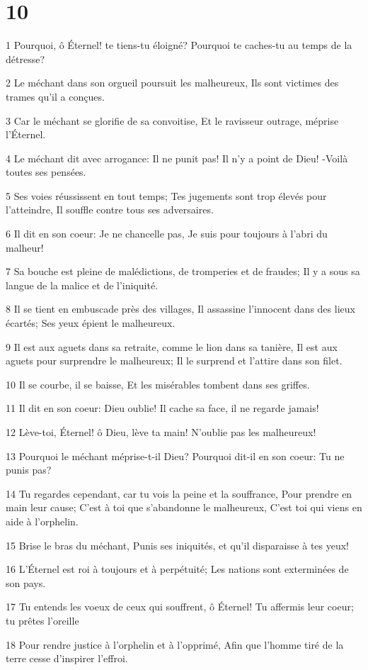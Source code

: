 \chapter{10}

\par 1 Pourquoi, ô Éternel! te tiens-tu éloigné? Pourquoi te caches-tu au temps de la détresse?
\par 2 Le méchant dans son orgueil poursuit les malheureux, Ils sont victimes des trames qu'il a conçues.
\par 3 Car le méchant se glorifie de sa convoitise, Et le ravisseur outrage, méprise l'Éternel.
\par 4 Le méchant dit avec arrogance: Il ne punit pas! Il n'y a point de Dieu! -Voilà toutes ses pensées.
\par 5 Ses voies réussissent en tout temps; Tes jugements sont trop élevés pour l'atteindre, Il souffle contre tous ses adversaires.
\par 6 Il dit en son coeur: Je ne chancelle pas, Je suis pour toujours à l'abri du malheur!
\par 7 Sa bouche est pleine de malédictions, de tromperies et de fraudes; Il y a sous sa langue de la malice et de l'iniquité.
\par 8 Il se tient en embuscade près des villages, Il assassine l'innocent dans des lieux écartés; Ses yeux épient le malheureux.
\par 9 Il est aux aguets dans sa retraite, comme le lion dans sa tanière, Il est aux aguets pour surprendre le malheureux; Il le surprend et l'attire dans son filet.
\par 10 Il se courbe, il se baisse, Et les misérables tombent dans ses griffes.
\par 11 Il dit en son coeur: Dieu oublie! Il cache sa face, il ne regarde jamais!
\par 12 Lève-toi, Éternel! ô Dieu, lève ta main! N'oublie pas les malheureux!
\par 13 Pourquoi le méchant méprise-t-il Dieu? Pourquoi dit-il en son coeur: Tu ne punis pas?
\par 14 Tu regardes cependant, car tu vois la peine et la souffrance, Pour prendre en main leur cause; C'est à toi que s'abandonne le malheureux, C'est toi qui viens en aide à l'orphelin.
\par 15 Brise le bras du méchant, Punis ses iniquités, et qu'il disparaisse à tes yeux!
\par 16 L'Éternel est roi à toujours et à perpétuité; Les nations sont exterminées de son pays.
\par 17 Tu entends les voeux de ceux qui souffrent, ô Éternel! Tu affermis leur coeur; tu prêtes l'oreille
\par 18 Pour rendre justice à l'orphelin et à l'opprimé, Afin que l'homme tiré de la terre cesse d'inspirer l'effroi.

